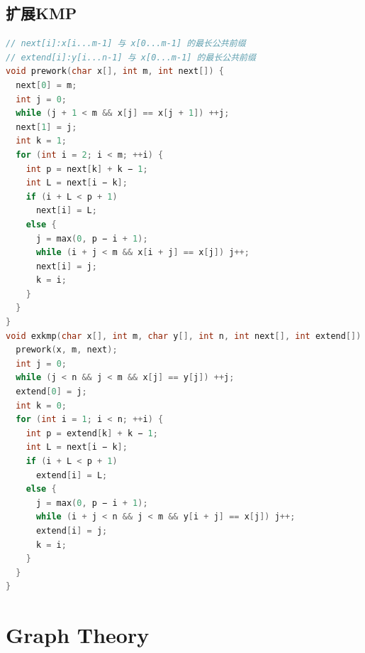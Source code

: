 \documentclass[twoside]{article}
\begin{document}
\subsection{扩展KMP}
\begin{lstlisting}[language=c++]
// next[i]:x[i...m-1] 与 x[0...m-1] 的最长公共前缀
// extend[i]:y[i...n-1] 与 x[0...m-1] 的最长公共前缀
void prework(char x[], int m, int next[]) {
  next[0] = m;
  int j = 0;
  while (j + 1 < m && x[j] == x[j + 1]) ++j;
  next[1] = j;
  int k = 1;
  for (int i = 2; i < m; ++i) {
    int p = next[k] + k − 1;
    int L = next[i − k];
    if (i + L < p + 1)
      next[i] = L;
    else {
      j = max(0, p − i + 1);
      while (i + j < m && x[i + j] == x[j]) j++;
      next[i] = j;
      k = i;
    }
  }
}
void exkmp(char x[], int m, char y[], int n, int next[], int extend[]) {
  prework(x, m, next);
  int j = 0;
  while (j < n && j < m && x[j] == y[j]) ++j;
  extend[0] = j;
  int k = 0;
  for (int i = 1; i < n; ++i) {
    int p = extend[k] + k − 1;
    int L = next[i − k];
    if (i + L < p + 1)
      extend[i] = L;
    else {
      j = max(0, p − i + 1);
      while (i + j < n && j < m && y[i + j] == x[j]) j++;
      extend[i] = j;
      k = i;
    }
  }
}

\end{lstlisting}

\section{Graph Theory}
\end{document}
